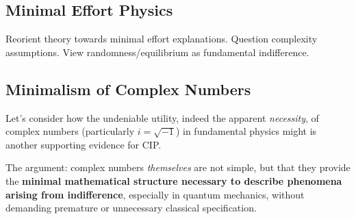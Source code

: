 \documentclass[11pt, a4paper]{article}
\begin{document}
\subsection{Minimal Effort Physics}
Reorient theory towards minimal effort explanations. Question complexity assumptions. View randomness/equilibrium as fundamental indifference.

\subsection{Minimalism of Complex Numbers}
Let's consider how the undeniable utility, indeed the apparent \textit{necessity}, of complex numbers (particularly $i = \sqrt{-1}$) in fundamental physics might is another supporting evidence for CIP.

The argument: complex numbers \textit{themselves} are not simple, but that they provide the \textbf{minimal mathematical structure necessary to describe phenomena arising from indifference}, especially in quantum mechanics, without demanding premature or unnecessary classical specification.
\end{document}
